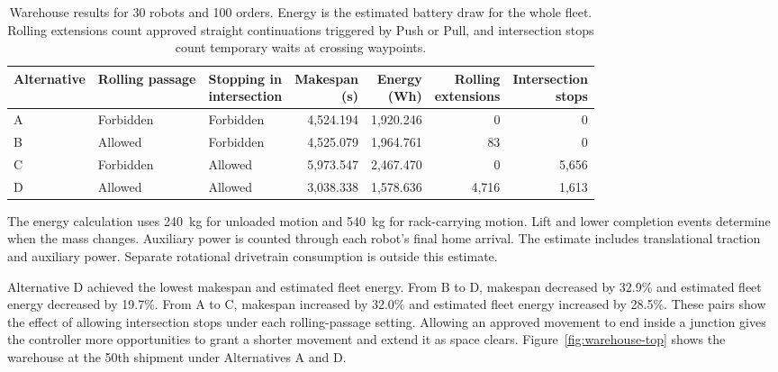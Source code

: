 \documentclass[11pt,a4paper]{article}
\begin{document}
\begin{table}[H]
\centering
\small
\caption{Warehouse results for 30 robots and 100 orders. Energy is the
estimated battery draw for the whole fleet. Rolling extensions count
approved straight continuations triggered by Push or Pull, and
intersection stops count temporary waits at crossing waypoints.}
\label{tab:warehouse-results}
\begin{tabular}{@{}lllrrrr@{}}
\toprule
Alternative & Rolling passage & \shortstack[l]{Stopping in\\intersection}
& \shortstack[r]{Makespan\\(s)} & \shortstack[r]{Energy\\(Wh)}
& \shortstack[r]{Rolling\\extensions}
& \shortstack[r]{Intersection\\stops}\\
\midrule
A & Forbidden & Forbidden & 4,524.194 & 1,920.246 & 0 & 0\\
B & Allowed   & Forbidden & 4,525.079 & 1,964.761 & 83 & 0\\
C & Forbidden & Allowed   & 5,973.547 & 2,467.470 & 0 & 5,656\\
D & Allowed   & Allowed   & 3,038.338 & 1,578.636 & 4,716 & 1,613\\
\bottomrule
\end{tabular}
\end{table}

The energy calculation uses 240~kg for unloaded motion and 540~kg for
rack-carrying motion. Lift and lower completion events determine when the
mass changes. Auxiliary power is counted through each robot's final home
arrival. The estimate includes translational traction and auxiliary power.
Separate rotational drivetrain consumption is outside this estimate.

Alternative D achieved the lowest makespan and estimated fleet energy.
From B to D, makespan decreased by 32.9\% and estimated fleet
energy decreased by 19.7\%.
From A to C, makespan increased by 32.0\% and estimated fleet
energy increased by 28.5\%.
These pairs show the effect of allowing intersection stops under each
rolling-passage setting. Allowing an approved movement to end inside
a junction gives the controller more opportunities to grant a shorter
movement and extend it as space clears.
Figure~\ref{fig:warehouse-top} shows the warehouse at the 50th shipment
under Alternatives A and D.
\end{document}
